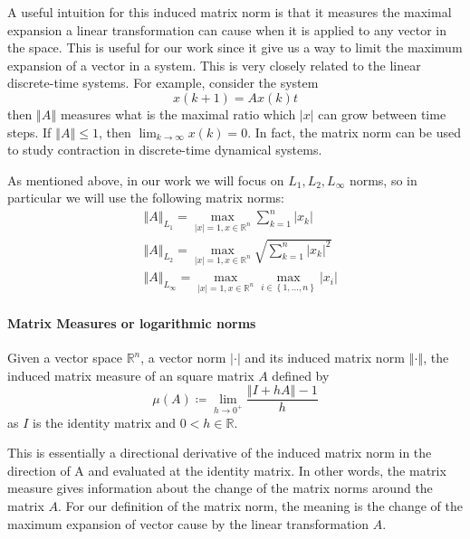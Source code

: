 \documentclass[12pt,English]{article}
\begin{document}
A useful intuition for this induced matrix norm is that it measures the maximal expansion a linear transformation can cause when it is applied to any vector in the space. This is useful for our work since it give us a way to limit the maximum expansion of a vector in a system. This is very closely related to the linear discrete-time systems. For example, consider the system 
$$x\left(k+1\right)=Ax\left( k \right)t$$
then $\left\Vert A \right\Vert$ measures what is the maximal ratio which $\left|x\right|$ can grow between
time steps. If $\left\Vert A \right\Vert\leq1$, then $\lim_{k\rightarrow\infty}x\left(k\right)=0$. In fact, the matrix norm can be used to study contraction in discrete-time dynamical systems.

As mentioned above, in our work we will focus on $L_{1},L_{2},L_{\infty}$ norms, so in particular we will use the following matrix norms:
\begin{align}
&\left\Vert A\right\Vert_{L_1}=\max_{\left|x\right|=1 , x\in\mathbb{R}^{n}}\sum_{k=1}^{n}\left|x_{k}\right|
\\
&\left\Vert A\right\Vert_{L_2}=\max_{\left|x\right|=1 , x\in\mathbb{R}^{n}} \sqrt{\sum_{k=1}^{n}\left|x_{k}\right|^{2}}
\\
&\left\Vert A\right\Vert_{L_\infty}=\max_{\left|x\right|=1 , x\in\mathbb{R}^{n}} \max_{i\in\left\{ 1,\dots,n\right\}}\left|x_{i}\right|
\end{align}

\paragraph{Matrix Measures or logarithmic norms}\hfill\break
\begin{defn}
Given a vector space $\mathbb{R}^{n}$, a vector norm $\left|\cdot\right|$ and its induced matrix norm $\left\Vert\cdot\right\Vert$, the induced matrix measure of an square matrix $A$ defined by
$$\mu\left(A\right)\coloneqq\lim_{h\rightarrow0^+}\frac{\left\Vert I+hA\right\Vert-1}{h}$$
as $I$ is the identity matrix and $0<h\in\mathbb{R}$.
\end{defn}

This is essentially a directional derivative of the induced matrix norm in the
direction of A and evaluated at the identity matrix. In other words, the matrix measure gives information about the change of the matrix norms around the matrix $A$. For our definition of the matrix norm, the meaning is the change of the maximum expansion of vector cause by the linear transformation $A$.
\end{document}
